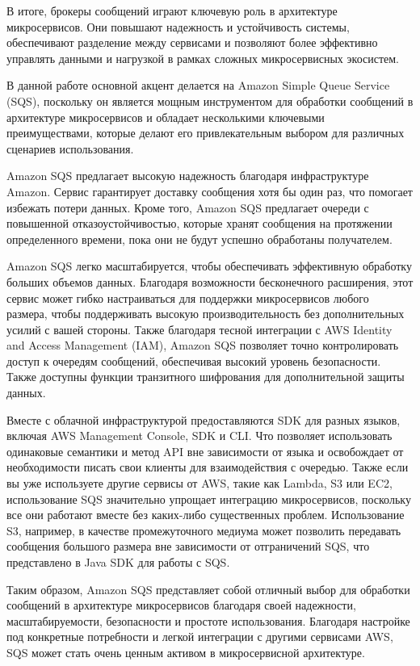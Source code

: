 В итоге, брокеры сообщений играют ключевую роль в архитектуре микросервисов. Они повышают надежность и устойчивость системы, обеспечивают разделение между сервисами и позволяют более эффективно управлять данными и нагрузкой в рамках сложных микросервисных экосистем.

В данной работе основной акцент делается на Amazon Simple Queue Service (SQS), поскольку он является мощным инструментом для обработки сообщений в архитектуре микросервисов и обладает несколькими ключевыми преимуществами, 
которые делают его привлекательным выбором для различных сценариев использования.

Amazon SQS предлагает высокую надежность благодаря инфраструктуре Amazon. 
Сервис гарантирует доставку сообщения хотя бы один раз, что помогает избежать потери данных. Кроме того, Amazon SQS предлагает очереди с повышенной отказоустойчивостью, которые хранят сообщения на протяжении определенного времени, пока они не будут успешно обработаны получателем.

Amazon SQS легко масштабируется, чтобы обеспечивать эффективную обработку больших объемов данных. 
Благодаря возможности бесконечного расширения, этот сервис может гибко настраиваться для поддержки микросервисов любого размера, чтобы поддерживать высокую производительность без дополнительных усилий с вашей стороны.
Также благодаря тесной интеграции с AWS Identity and Access Management (IAM), Amazon SQS позволяет точно контролировать доступ к очередям сообщений, обеспечивая высокий уровень безопасности. Также доступны функции транзитного шифрования для дополнительной защиты данных.

Вместе с облачной инфраструктурой предоставляются SDK для разных языков, включая AWS Management Console, SDK и CLI. Что позволяет использовать одинаковые семантики и метод API вне зависимости от языка и освобождает от необходимости писать свои клиенты для
взаимодействия с очередью.
Также если вы уже используете другие сервисы от AWS, такие как Lambda, S3 или EC2, использование SQS значительно упрощает интеграцию микросервисов, поскольку все они работают вместе без каких-либо существенных проблем. Использование
S3, например, в качестве промежуточного медиума может позволить передавать сообщения большого размера вне зависимости от отграничений SQS, что представлено в Java SDK для работы с SQS.

Таким образом, Amazon SQS представляет собой отличный выбор для обработки сообщений в архитектуре микросервисов благодаря своей надежности, масштабируемости, безопасности и простоте использования. Благодаря настройке под конкретные потребности и легкой интеграции с другими сервисами AWS, SQS может стать очень ценным активом в микросервисной архитектуре.

